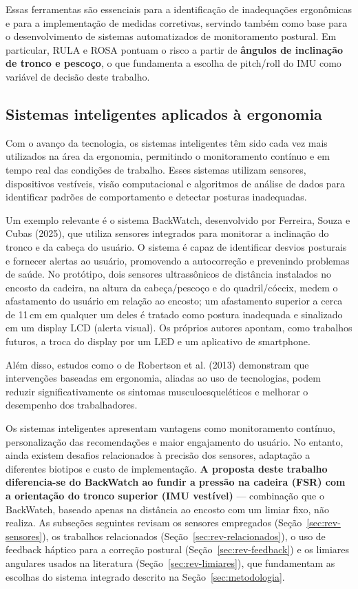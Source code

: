 Essas ferramentas são essenciais para a identificação de inadequações ergonômicas e
para a implementação de medidas corretivas, servindo também como base para o
desenvolvimento de sistemas automatizados de monitoramento postural. Em particular,
RULA e ROSA pontuam o risco a partir de \textbf{ângulos de inclinação de tronco e
pescoço}, o que fundamenta a escolha de pitch/roll do IMU como variável de decisão
deste trabalho.

\subsection{Sistemas inteligentes aplicados à ergonomia}

Com o avanço da tecnologia, os sistemas inteligentes têm sido cada vez mais
utilizados na área da ergonomia, permitindo o monitoramento contínuo e em tempo real
das condições de trabalho. Esses sistemas utilizam sensores, dispositivos
vestíveis, visão computacional e algoritmos de análise de dados para identificar
padrões de comportamento e detectar posturas inadequadas.

Um exemplo relevante é o sistema BackWatch, desenvolvido por Ferreira, Souza e Cubas
(2025), que utiliza sensores integrados para monitorar a inclinação do tronco e da
cabeça do usuário. O sistema é capaz de identificar desvios posturais e fornecer
alertas ao usuário, promovendo a autocorreção e prevenindo problemas de saúde. No
protótipo, dois sensores ultrassônicos de distância instalados no encosto da
cadeira, na altura da cabeça/pescoço e do quadril/cóccix, medem o afastamento do
usuário em relação ao encosto; um afastamento superior a cerca de 11\,cm em
qualquer um deles é tratado como postura inadequada e sinalizado em um display LCD
(alerta visual). Os próprios autores apontam, como trabalhos futuros, a troca do
display por um LED e um aplicativo de smartphone.

Além disso, estudos como o de Robertson et al. (2013) demonstram que intervenções
baseadas em ergonomia, aliadas ao uso de tecnologias, podem reduzir
significativamente os sintomas musculoesqueléticos e melhorar o desempenho dos
trabalhadores.

Os sistemas inteligentes apresentam vantagens como monitoramento contínuo,
personalização das recomendações e maior engajamento do usuário. No entanto, ainda
existem desafios relacionados à precisão dos sensores, adaptação a diferentes
biotipos e custo de implementação. \textbf{A proposta deste trabalho diferencia-se do
BackWatch ao fundir a pressão na cadeira (FSR) com a orientação do tronco superior
(IMU vestível)} --- combinação que o BackWatch, baseado apenas na distância ao
encosto com um limiar fixo, não realiza. As subseções seguintes revisam os sensores
empregados (Seção~\ref{sec:rev-sensores}), os trabalhos relacionados
(Seção~\ref{sec:rev-relacionados}), o uso de feedback háptico para a correção
postural (Seção~\ref{sec:rev-feedback}) e os limiares angulares usados na
literatura (Seção~\ref{sec:rev-limiares}), que fundamentam as escolhas do sistema
integrado descrito na Seção~\ref{sec:metodologia}.

